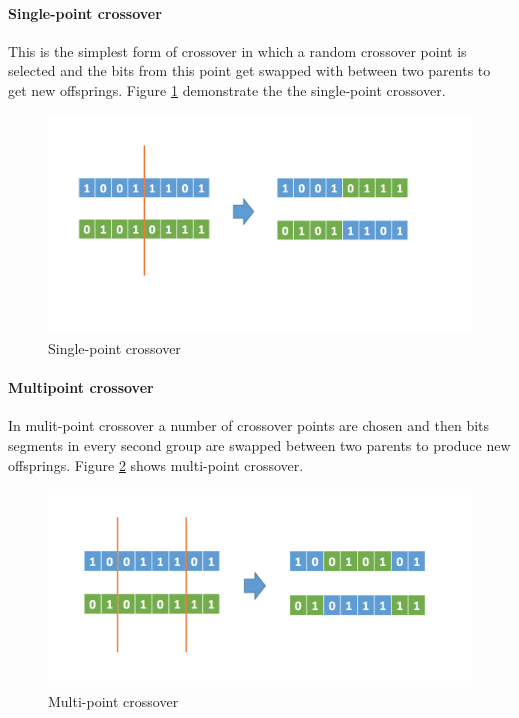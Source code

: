 \paragraph{Single-point crossover}
This is the simplest form of crossover in which a random crossover point is selected and the bits from this point get swapped with between two parents to get new offsprings. Figure \ref{fig:sp-cross} demonstrate the the single-point crossover.

\begin{figure}[!htb]
  \includegraphics[width=\linewidth]{figs/single-point_crossover.png}
  \caption{Single-point crossover}
  \label{fig:sp-cross}
\end{figure}

\paragraph{Multipoint crossover}
In mulit-point crossover a number of crossover points are chosen and then bits segments in every second group are swapped between two parents to produce new offsprings. Figure \ref{fig:mp-cross} shows multi-point crossover. 

\begin{figure}[!htb]
  \includegraphics[width=\linewidth]{figs/multi-point_crossover.png}
  \caption{Multi-point crossover}
  \label{fig:mp-cross}
\end{figure}

